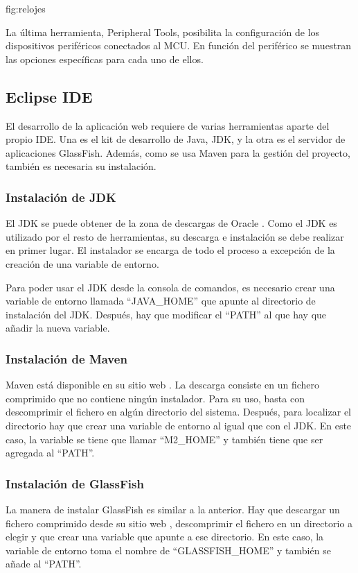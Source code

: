 {fig:relojes}{}

La última herramienta, Peripheral Tools, posibilita la configuración de los
dispositivos periféricos conectados al MCU. En función del periférico se
muestran las opciones específicas para cada uno de ellos.



\subsection{Eclipse IDE} \label{sec:man-dev-eclipse}
El desarrollo de la aplicación web requiere de varias herramientas aparte
del propio IDE. Una es el kit de desarrollo de Java, JDK, y la otra es el
servidor de aplicaciones GlassFish. Además, como se usa Maven para la gestión
del proyecto, también es necesaria su instalación.

\subsubsection{Instalación de JDK} \label{sec:jdk}
El JDK se puede obtener de la zona de descargas de Oracle \cite{webpage:javaee}.
Como el JDK es utilizado por el resto de herramientas, su descarga e instalación
se debe realizar en primer lugar. El instalador se encarga de todo el proceso a
excepción de la creación de una variable de entorno.

Para poder usar el JDK desde la consola de comandos, es necesario crear
una variable de entorno llamada ``JAVA\_HOME'' que apunte al directorio de
instalación del JDK. Después, hay que modificar el ``PATH'' al que hay
que añadir la nueva variable.

\subsubsection{Instalación de Maven} \label{sec:maven}
Maven está disponible en su sitio web \cite{webpage:maven}. La descarga consiste
en un fichero comprimido que no contiene ningún instalador. Para su uso, basta
con descomprimir el fichero en algún directorio del sistema. Después, para
localizar el directorio hay que crear una variable de entorno al igual que con
el JDK. En este caso, la variable se tiene que llamar ``M2\_HOME'' y también
tiene que ser agregada al ``PATH''.

\subsubsection{Instalación de GlassFish} \label{sec:glassfish}
La manera de instalar GlassFish es similar a la anterior. Hay que descargar un
fichero comprimido desde su sitio web \cite{webpage:glassfish}, descomprimir
el fichero en un directorio a elegir y que crear una variable que apunte a ese
directorio. En este caso, la variable de entorno toma el nombre de 
``GLASSFISH\_HOME'' y también se añade al ``PATH''.

